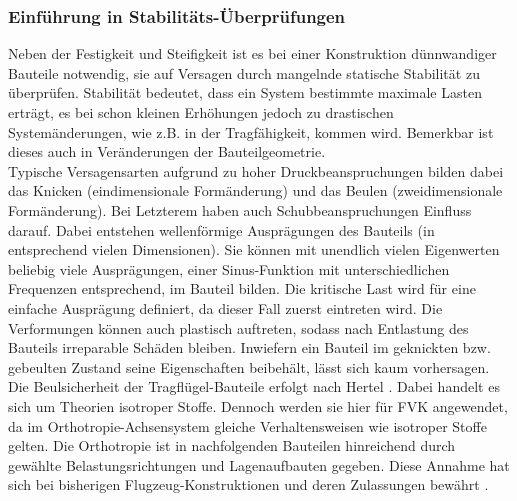 \subsubsection{Einführung in Stabilitäts-Überprüfungen}
Neben der Festigkeit und Steifigkeit ist es bei einer Konstruktion dünnwandiger Bauteile notwendig, sie auf Versagen durch mangelnde statische Stabilität zu überprüfen. Stabilität bedeutet, dass ein System bestimmte maximale Lasten erträgt, es bei schon kleinen Erhöhungen jedoch zu drastischen Systemänderungen, wie z.B. in der Tragfähigkeit, kommen wird. Bemerkbar ist dieses auch in Veränderungen der Bauteilgeometrie.\\

\noindent Typische Versagensarten aufgrund zu hoher Druckbeanspruchungen bilden dabei das Knicken (eindimensionale Formänderung) und das Beulen (zweidimensionale Formänderung). Bei Letzterem haben auch Schubbeanspruchungen Einfluss darauf. Dabei entstehen wellenförmige Ausprägungen des Bauteils (in entsprechend vielen Dimensionen). Sie können mit unendlich vielen Eigenwerten beliebig viele Ausprägungen, einer Sinus-Funktion mit unterschiedlichen Frequenzen entsprechend, im Bauteil bilden. Die kritische Last wird für eine einfache Ausprägung definiert, da dieser Fall zuerst eintreten wird. Die Verformungen können auch plastisch auftreten, sodass nach Entlastung des Bauteils irreparable Schäden bleiben. Inwiefern ein Bauteil im geknickten bzw. gebeulten Zustand seine Eigenschaften beibehält, lässt sich kaum vorhersagen.\\

\noindent Die Beulsicherheit der Tragflügel-Bauteile erfolgt nach Hertel \cite{item1}. Dabei handelt es sich um Theorien isotroper Stoffe. Dennoch werden sie hier für FVK angewendet, da im Orthotropie-Achsensystem gleiche Verhaltensweisen wie isotroper Stoffe gelten. Die Orthotropie ist in nachfolgenden Bauteilen hinreichend durch gewählte Belastungsrichtungen und Lagenaufbauten gegeben. Diese Annahme hat sich bei bisherigen Flugzeug-Konstruktionen und deren Zulassungen bewährt \cite{item21}.\\

